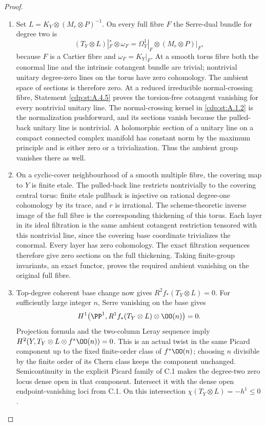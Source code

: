 \begin{proof}
\begin{enumerate}[label={$\langle1\rangle$\arabic*.},leftmargin=*]
\item Set $L=K_Y\otimes(M_r\otimes P)^{-1}$. On every full fibre $F$ the Serre-dual bundle for degree two is
\[
 (T_Y\otimes L)|_F^*\otimes\omega_F
       =\Omega_Y^1|_F\otimes(M_r\otimes P)|_F,
\]
because $F$ is a Cartier fibre and $\omega_F=K_Y|_F$. At a smooth torus fibre both the conormal line and the intrinsic cotangent bundle are trivial; nontrivial unitary degree-zero lines on the torus have zero cohomology. The ambient space of sections is therefore zero. At a reduced irreducible normal-crossing fibre, Statement \ref{cdp:st:A.4.5} proves the torsion-free cotangent vanishing for every nontrivial unitary line. The normal-crossing kernel in \ref{cdp:st:A.1.2} is the normalization pushforward, and its sections vanish because the pulled-back unitary line is nontrivial. A holomorphic section of a unitary line on a compact connected complex manifold has constant norm by the maximum principle and is either zero or a trivialization. Thus the ambient group vanishes there as well.

\item On a cyclic-cover neighbourhood of a smooth multiple fibre, the covering map to $Y$ is finite etale. The pulled-back line restricts nontrivially to the covering central torus: finite etale pullback is injective on rational degree-one cohomology by its trace, and $r$ is irrational. The scheme-theoretic inverse image of the full fibre is the corresponding thickening of this torus. Each layer in its ideal filtration is the same ambient cotangent restriction tensored with this nontrivial line, since the covering base coordinate trivializes the conormal. Every layer has zero cohomology. The exact filtration sequences therefore give zero sections on the full thickening. Taking finite-group invariants, an exact functor, proves the required ambient vanishing on the original full fibre.

\item Top-degree coherent base change now gives $R^2f_*(T_Y\otimes L)=0$. For sufficiently large integer $n$, Serre vanishing on the base gives
\[
H^1\bigl(\PP^1,R^1f_*(T_Y\otimes L)\otimes\OO(n)\bigr)=0.
\]
Projection formula and the two-column Leray sequence imply
$H^2(Y,T_Y\otimes L\otimes f^*\OO(n))=0$.
This is an actual twist in the same Picard component up to the fixed finite-order class of $f^*\OO(n)$; choosing $n$ divisible by the finite order of its Chern class keeps the component unchanged. Semicontinuity in the explicit Picard family of C.1 makes the degree-two zero locus dense open in that component. Intersect it with the dense open endpoint-vanishing loci from C.1. On this intersection $\chi(T_Y\otimes L)=-h^1\le0$.


\end{enumerate}
\end{proof}
